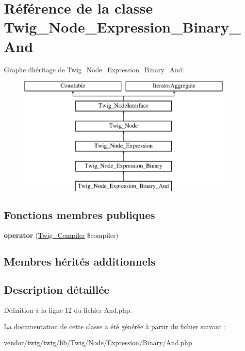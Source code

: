 \hypertarget{class_twig___node___expression___binary___and}{}\section{Référence de la classe Twig\+\_\+\+Node\+\_\+\+Expression\+\_\+\+Binary\+\_\+\+And}
\label{class_twig___node___expression___binary___and}
Graphe d\textquotesingle{}héritage de Twig\+\_\+\+Node\+\_\+\+Expression\+\_\+\+Binary\+\_\+\+And\+:\begin{figure}[H]
\begin{center}
\leavevmode
\includegraphics[height=6.000000cm]{class_twig___node___expression___binary___and}
\end{center}
\end{figure}
\subsection*{Fonctions membres publiques}
\begin{DoxyCompactItemize}
\item 
{\bfseries operator} (\hyperlink{class_twig___compiler}{Twig\+\_\+\+Compiler} \$compiler)\hypertarget{class_twig___node___expression___binary___and_af77318ec88d5f8a508684970a150b670}{}\label{class_twig___node___expression___binary___and_af77318ec88d5f8a508684970a150b670}

\end{DoxyCompactItemize}
\subsection*{Membres hérités additionnels}


\subsection{Description détaillée}


Définition à la ligne 12 du fichier And.\+php.



La documentation de cette classe a été générée à partir du fichier suivant \+:\begin{DoxyCompactItemize}
\item 
vendor/twig/twig/lib/\+Twig/\+Node/\+Expression/\+Binary/And.\+php\end{DoxyCompactItemize}
